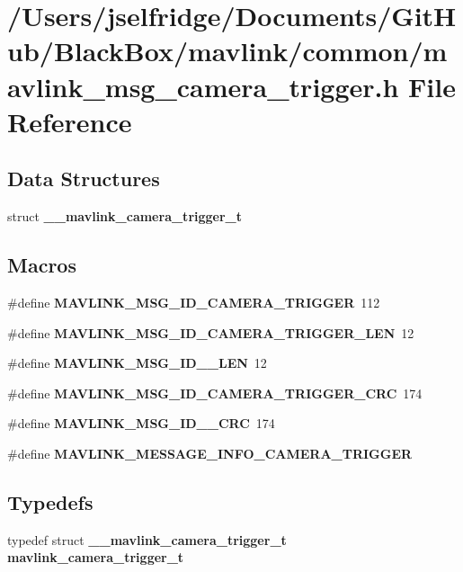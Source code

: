 \section{/\+Users/jselfridge/\+Documents/\+Git\+Hub/\+Black\+Box/mavlink/common/mavlink\+\_\+msg\+\_\+camera\+\_\+trigger.h File Reference}
\label{mavlink__msg__camera__trigger_8h}
\subsection*{Data Structures}
\begin{DoxyCompactItemize}
\item 
struct \textbf{ \+\_\+\+\_\+mavlink\+\_\+camera\+\_\+trigger\+\_\+t}
\end{DoxyCompactItemize}
\subsection*{Macros}
\begin{DoxyCompactItemize}
\item 
\#define \textbf{ M\+A\+V\+L\+I\+N\+K\+\_\+\+M\+S\+G\+\_\+\+I\+D\+\_\+\+C\+A\+M\+E\+R\+A\+\_\+\+T\+R\+I\+G\+G\+ER}~112
\item 
\#define \textbf{ M\+A\+V\+L\+I\+N\+K\+\_\+\+M\+S\+G\+\_\+\+I\+D\+\_\+\+C\+A\+M\+E\+R\+A\+\_\+\+T\+R\+I\+G\+G\+E\+R\+\_\+\+L\+EN}~12
\item 
\#define \textbf{ M\+A\+V\+L\+I\+N\+K\+\_\+\+M\+S\+G\+\_\+\+I\+D\+\_\+\_\+\+L\+EN}~12
\item 
\#define \textbf{ M\+A\+V\+L\+I\+N\+K\+\_\+\+M\+S\+G\+\_\+\+I\+D\+\_\+\+C\+A\+M\+E\+R\+A\+\_\+\+T\+R\+I\+G\+G\+E\+R\+\_\+\+C\+RC}~174
\item 
\#define \textbf{ M\+A\+V\+L\+I\+N\+K\+\_\+\+M\+S\+G\+\_\+\+I\+D\+\_\+\_\+\+C\+RC}~174
\item 
\#define \textbf{ M\+A\+V\+L\+I\+N\+K\+\_\+\+M\+E\+S\+S\+A\+G\+E\+\_\+\+I\+N\+F\+O\+\_\+\+C\+A\+M\+E\+R\+A\+\_\+\+T\+R\+I\+G\+G\+ER}
\end{DoxyCompactItemize}
\subsection*{Typedefs}
\begin{DoxyCompactItemize}
\item 
typedef struct \textbf{ \+\_\+\+\_\+mavlink\+\_\+camera\+\_\+trigger\+\_\+t} \textbf{ mavlink\+\_\+camera\+\_\+trigger\+\_\+t}
\end{DoxyCompactItemize}


